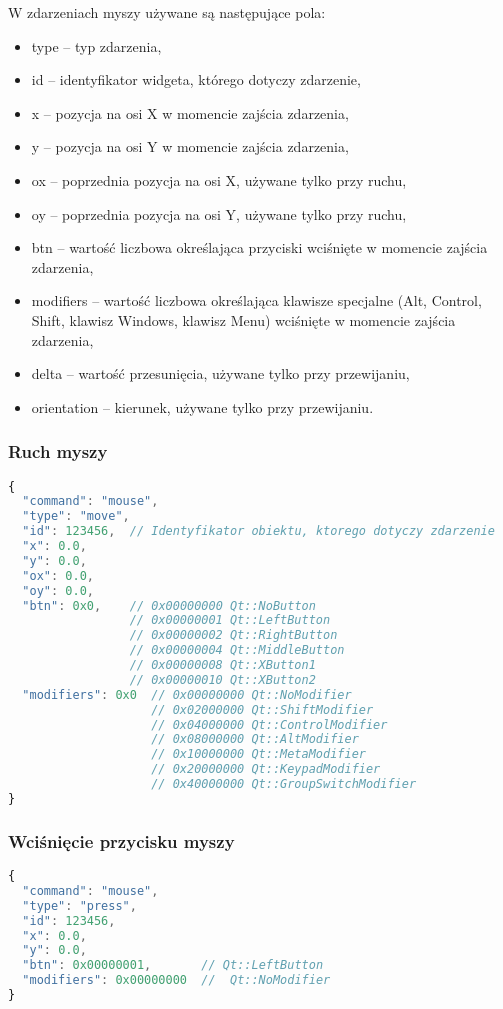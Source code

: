 W zdarzeniach myszy używane są następujące pola:
\begin{itemize}
\item type -- typ zdarzenia,
\item id -- identyfikator widgeta, którego dotyczy zdarzenie,
\item x -- pozycja na osi X w momencie zajścia zdarzenia,
\item y -- pozycja na osi Y w momencie zajścia zdarzenia,
\item ox -- poprzednia pozycja na osi X, używane tylko przy ruchu,
\item oy -- poprzednia pozycja na osi Y, używane tylko przy ruchu,
\item btn -- wartość liczbowa określająca przyciski wciśnięte w momencie zajścia zdarzenia,
\item modifiers -- wartość liczbowa określająca klawisze specjalne (Alt, Control, Shift, klawisz Windows, klawisz Menu) wciśnięte w momencie zajścia zdarzenia,
\item delta -- wartość przesunięcia, używane tylko przy przewijaniu,
\item orientation -- kierunek, używane tylko przy przewijaniu.
\end{itemize}

\subsubsection{Ruch myszy}

\begin{lstlisting}[language=JavaScript,numbers=none]
{
  "command": "mouse",
  "type": "move",
  "id": 123456,  // Identyfikator obiektu, ktorego dotyczy zdarzenie
  "x": 0.0,
  "y": 0.0,
  "ox": 0.0,
  "oy": 0.0,
  "btn": 0x0,    // 0x00000000 Qt::NoButton
                 // 0x00000001 Qt::LeftButton
                 // 0x00000002 Qt::RightButton
                 // 0x00000004 Qt::MiddleButton
                 // 0x00000008 Qt::XButton1
                 // 0x00000010 Qt::XButton2
  "modifiers": 0x0  // 0x00000000 Qt::NoModifier
                    // 0x02000000 Qt::ShiftModifier
                    // 0x04000000 Qt::ControlModifier
                    // 0x08000000 Qt::AltModifier
                    // 0x10000000 Qt::MetaModifier
                    // 0x20000000 Qt::KeypadModifier
                    // 0x40000000 Qt::GroupSwitchModifier
}
\end{lstlisting}

\subsubsection{Wciśnięcie przycisku myszy}
\begin{lstlisting}[language=JavaScript,numbers=none]
{
  "command": "mouse",
  "type": "press",
  "id": 123456,
  "x": 0.0,
  "y": 0.0,
  "btn": 0x00000001,       // Qt::LeftButton
  "modifiers": 0x00000000  //  Qt::NoModifier
}
\end{lstlisting}

